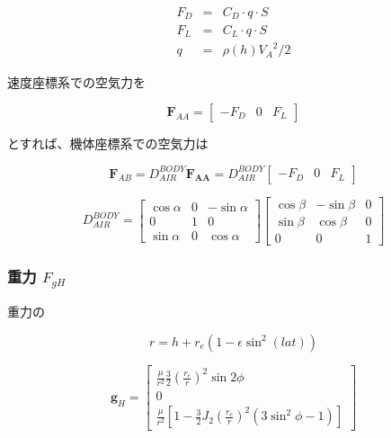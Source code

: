 \documentclass[12pt]{jsarticle}
\begin{document}
\begin{eqnarray}
  F_D &=& C_D \cdot q \cdot S \\
  F_L &=& C_L \cdot q \cdot S \\
  q &=& \rho (h) {V_A}^2 / 2
\end{eqnarray}

速度座標系での空気力を

\begin{equation}
  \bm{F}_{AA} = \left[
  \begin{array}{ccc}
    -F_{D} & 0 & F_{L}
  \end{array}
  \right]
\end{equation}

とすれば、機体座標系での空気力は

\begin{equation}
  \bm{F}_{AB} = D_{AIR}^{BODY} \bm{F_{AA}} = D_{AIR}^{BODY} \left[
  \begin{array}{ccc}
    -F_{D} & 0 & F_{L}
  \end{array} \right]
\end{equation}

\begin{equation}
  D_{AIR}^{BODY} = \left[
  \begin{array}{ccc}
    \cos\alpha & 0 & -\sin\alpha \\
    0 & 1 & 0 \\
    \sin\alpha & 0 & \cos\alpha
  \end{array} \right] \left[
  \begin{array}{ccc}
    \cos\beta & -\sin\beta & 0 \\
    \sin\beta & \cos\beta & 0 \\
    0 & 0 & 1
  \end{array} \right]
\end{equation}


\subsubsection{重力 $F_{gH}$}
重力の

\begin{equation}
  r = h + r_e \left( 1 - \epsilon \sin^2(lat) \right)
\end{equation}

\begin{equation}
  \bm{g}_H = \left[
    \begin{array}{c}
      \displaystyle　\frac{\mu}{r^2}\frac{3}{2}\left( \frac{r_e}{r}\right)^2 \sin2\phi \\[4mm]
      0 \\[4mm]
      \displaystyle　\frac{\mu}{r^2} \left[ 1 - \frac{3}{2}J_2\left( \frac{r_e}{r}\right)^2
      (3\sin^2\phi - 1) \right]
    \end{array} \right]
\end{equation}
\end{document}
